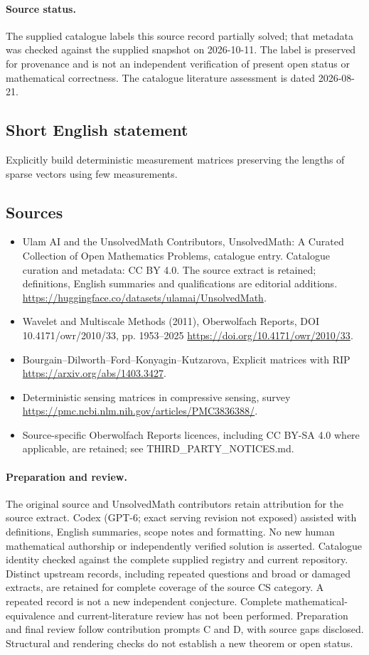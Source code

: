 \documentclass[11pt]{article}
\begin{document}
\paragraph{Source status.}
The supplied catalogue labels this source record partially solved; that metadata was checked against the supplied snapshot on 2026-10-11. The label is preserved for provenance and is not an independent verification of present open status or mathematical correctness. The catalogue literature assessment is dated 2026-08-21.
\subsection{Short English statement}
Explicitly build deterministic measurement matrices preserving the lengths of sparse vectors using few measurements.
\subsection{Sources}
\begin{itemize}
\item[S1] Ulam AI and the UnsolvedMath Contributors, UnsolvedMath: A Curated Collection of Open Mathematics Problems, catalogue entry. Catalogue curation and metadata: CC BY 4.0. The source extract is retained; definitions, English summaries and qualifications are editorial additions.
\url{https://huggingface.co/datasets/ulamai/UnsolvedMath}.
\item[S2] Wavelet and Multiscale Methods (2011), Oberwolfach Reports, DOI 10.4171/owr/2010/33, pp. 1953--2025
\url{https://doi.org/10.4171/owr/2010/33}.
\item[S3] Bourgain--Dilworth--Ford--Konyagin--Kutzarova, Explicit matrices with RIP
\url{https://arxiv.org/abs/1403.3427}.
\item[S4] Deterministic sensing matrices in compressive sensing, survey
\url{https://pmc.ncbi.nlm.nih.gov/articles/PMC3836388/}.
\item Source-specific Oberwolfach Reports licences, including CC BY-SA 4.0 where applicable, are retained; see THIRD\_PARTY\_NOTICES.md.
\end{itemize}
\paragraph{Preparation and review.}
The original source and UnsolvedMath contributors retain attribution for the source extract. Codex (GPT-6; exact serving revision not exposed) assisted with definitions, English summaries, scope notes and formatting. No new human mathematical authorship or independently verified solution is asserted. Catalogue identity checked against the complete supplied registry and current repository. Distinct upstream records, including repeated questions and broad or damaged extracts, are retained for complete coverage of the source CS category. A repeated record is not a new independent conjecture. Complete mathematical-equivalence and current-literature review has not been performed. Preparation and final review follow contribution prompts C and D, with source gaps disclosed. Structural and rendering checks do not establish a new theorem or open status.
\label{end:statement}
\end{document}
